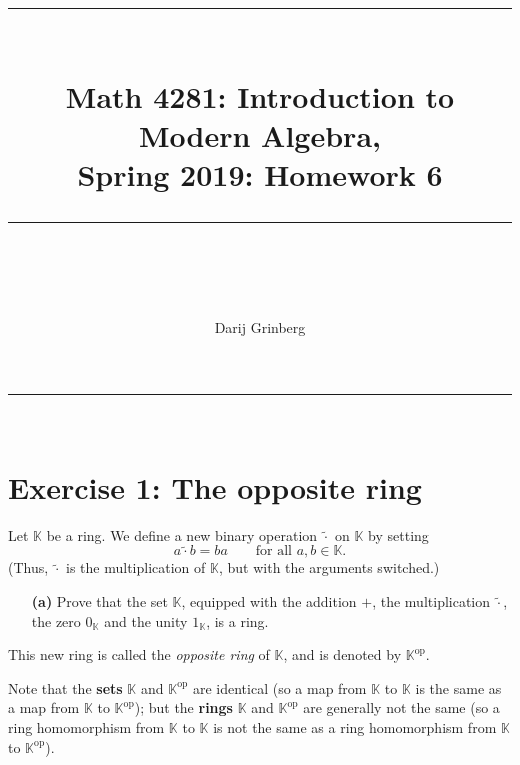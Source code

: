 \documentclass[paper=a4, fontsize=12pt]{scrartcl}%
\theoremstyle{plainsl}
\theoremstyle{definition}
\theoremstyle{remark}
\begin{document}
\title{ \\[25pt] \rule{\linewidth}{0.5pt} \\[0.4cm] {\huge Math 4281: Introduction to Modern Algebra, }\\Spring 2019: Homework 6\\\rule{\linewidth}{2pt} \\[0.5cm] }
\author{Darij Grinberg}
\maketitle

\rule{\linewidth}{0.3pt} \\[0.4cm]

\section{Exercise 1: The opposite ring}

Let $\mathbb{K}$ be a ring. We define a new binary operation $\left.
\widetilde{\cdot} \right.  $ on $\mathbb{K}$ by setting
\[
a \left.  \widetilde{\cdot} \right.  b = ba \qquad\text{for all } a, b
\in\mathbb{K} .
\]
(Thus, $\left.  \widetilde{\cdot} \right.  $ is the multiplication of
$\mathbb{K}$, but with the arguments switched.)

\begin{enumerate}
\item[\textbf{(a)}] Prove that the set $\mathbb{K}$, equipped with the
addition $+$, the multiplication $\left.  \widetilde{\cdot} \right.  $, the
zero $0_{\mathbb{K}}$ and the unity $1_{\mathbb{K}}$, is a ring.
\end{enumerate}

\noindent This new ring is called the \textit{opposite ring} of $\mathbb{K}$,
and is denoted by $\mathbb{K}^{\operatorname{op}}$.

Note that the \textbf{sets} $\mathbb{K}$ and $\mathbb{K}^{\operatorname{op}}$
are identical (so a map from $\mathbb{K}$ to $\mathbb{K}$ is the same as a map
from $\mathbb{K}$ to $\mathbb{K}^{\operatorname{op}}$); but the \textbf{rings}
$\mathbb{K}$ and $\mathbb{K}^{\operatorname{op}}$ are generally not the same
(so a ring homomorphism from $\mathbb{K}$ to $\mathbb{K}$ is not the same as a
ring homomorphism from $\mathbb{K}$ to $\mathbb{K}^{\operatorname{op}}$).
\end{document}
